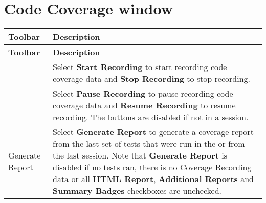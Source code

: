 \chapter{Code Coverage window}
\hypertarget{md__library_2_package_cache_2com_8unity_8testtools_8codecoverage_0d1_82_85_2_documentation_0i_2_code_coverage_window}{}\label{md__library_2_package_cache_2com_8unity_8testtools_8codecoverage_0d1_82_85_2_documentation_0i_2_code_coverage_window}
\label{md__library_2_package_cache_2com_8unity_8testtools_8codecoverage_0d1_82_85_2_documentation_0i_2_code_coverage_window_autotoc_md812}%
%
 

\tabulinesep=1mm
\begin{longtabu}spread 0pt [c]{*{2}{|X[-1]}|}
\hline
\cellcolor{\tableheadbgcolor}\textbf{ {\bfseries{Toolbar}}   }&\cellcolor{\tableheadbgcolor}\textbf{ {\bfseries{Description}}    }\\
\endfirsthead
\hline
\endfoot
\hline
\cellcolor{\tableheadbgcolor}\textbf{ {\bfseries{Toolbar}}   }&\cellcolor{\tableheadbgcolor}\textbf{ {\bfseries{Description}}    }\\
\endhead
   &Select {\bfseries{Start Recording}} to start recording code coverage data and {\bfseries{Stop Recording}} to stop recording.    \\
   &Select {\bfseries{Pause Recording}} to pause recording code coverage data and {\bfseries{Resume Recording}} to resume recording. The buttons are disabled if not in a  session.    \\
Generate Report   &Select {\bfseries{Generate Report}} to generate a coverage report from the last set of tests that were run in the  or from the last  session. Note that {\bfseries{Generate Report}} is disabled if no tests ran, there is no Coverage Recording data or all {\bfseries{HTML Report}}, {\bfseries{Additional Reports}} and {\bfseries{Summary Badges}} checkboxes are unchecked.    \\

\end{longtabu}
